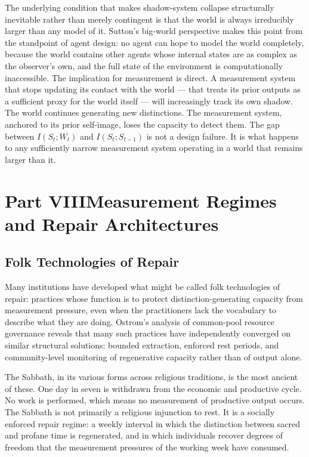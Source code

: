\documentclass[12pt, a4paper]{article}
\theoremstyle{flyxion}
\begin{document}
The underlying condition that makes shadow-system collapse structurally inevitable rather than merely contingent is that the world is always irreducibly larger than any model of it. Sutton's big-world perspective \cite{sutton2019} makes this point from the standpoint of agent design: no agent can hope to model the world completely, because the world contains other agents whose internal states are as complex as the observer's own, and the full state of the environment is computationally inaccessible. The implication for measurement is direct. A measurement system that stops updating its contact with the world --- that treats its prior outputs as a sufficient proxy for the world itself --- will increasingly track its own shadow. The world continues generating new distinctions. The measurement system, anchored to its prior self-image, loses the capacity to detect them. The gap between $I(S_t; W_t)$ and $I(S_t; S_{t-1})$ is not a design failure. It is what happens to any sufficiently narrow measurement system operating in a world that remains larger than it.


\section*{Part VIII\quad Measurement Regimes and Repair Architectures}

\subsection*{Folk Technologies of Repair}

Many institutions have developed what might be called folk technologies of repair: practices whose function is to protect distinction-generating capacity from measurement pressure, even when the practitioners lack the vocabulary to describe what they are doing. Ostrom's analysis of common-pool resource governance \cite{ostrom1990} reveals that many such practices have independently converged on similar structural solutions: bounded extraction, enforced rest periods, and community-level monitoring of regenerative capacity rather than of output alone.

The Sabbath, in its various forms across religious traditions, is the most ancient of these. One day in seven is withdrawn from the economic and productive cycle. No work is performed, which means no measurement of productive output occurs. The Sabbath is not primarily a religious injunction to rest. It is a socially enforced repair regime: a weekly interval in which the distinction between sacred and profane time is regenerated, and in which individuals recover degrees of freedom that the measurement pressures of the working week have consumed.
\end{document}
